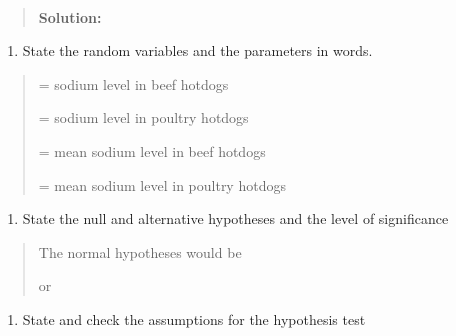 \documentclass[]{book}
\providecommand{\tightlist}{%
  \setlength{\itemsep}{0pt}\setlength{\parskip}{0pt}}
\begin{document}
\textbf{\\
}

\begin{quote}
\textbf{Solution:}
\end{quote}

\begin{enumerate}
\def\labelenumi{\arabic{enumi}.}
\tightlist
\item
  State the random variables and the parameters in words.
\end{enumerate}

\begin{quote}
= sodium level in beef hotdogs

= sodium level in poultry hotdogs

= mean sodium level in beef hotdogs

= mean sodium level in poultry hotdogs
\end{quote}

\begin{enumerate}
\def\labelenumi{\arabic{enumi}.}
\setcounter{enumi}{1}
\tightlist
\item
  State the null and alternative hypotheses and the level of
  significance
\end{enumerate}

\begin{quote}
The normal hypotheses would be

or
\end{quote}

\begin{enumerate}
\def\labelenumi{\arabic{enumi}.}
\setcounter{enumi}{2}
\tightlist
\item
  State and check the assumptions for the hypothesis test
\end{enumerate}
\end{document}
